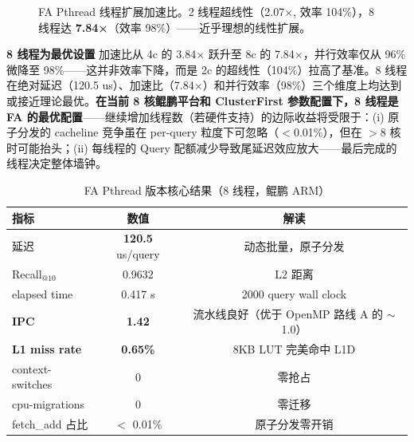 \documentclass[UTF8,a4paper,10pt]{ctexart}
\begin{document}
\begin{figure}[H]
\centering
{}
\caption{FA Pthread 线程扩展加速比。2 线程超线性（2.07×, 效率 104\%），8 线程达 \textbf{7.84×}（效率 98\%）——近乎理想的线性扩展。}
\label{fig:fa_speedup}
\end{figure}

\textbf{8 线程为最优设置} 加速比从 4c 的 3.84× 跃升至 8c 的 7.84×，并行效率仅从 96\% 微降至 98\%——这并非效率下降，而是 2c 的超线性（104\%）拉高了基准。8 线程在绝对延迟（120.5 us）、加速比（7.84×）和并行效率（98\%）三个维度上均达到或接近理论最优。\textbf{在当前 8 核鲲鹏平台和 ClusterFirst 参数配置下，8 线程是 FA 的最优配置}——继续增加线程数（若硬件支持）的边际收益将受限于：(i) 原子分发的 cacheline 竞争虽在 per-query 粒度下可忽略（$<$0.01\%），但在 $>$8 核时可能抬头；(ii) 每线程的 Query 配额减少导致尾延迟效应放大——最后完成的线程决定整体墙钟。


\begin{table}[H]
\centering
\caption{FA Pthread 版本核心结果（8 线程，鲲鹏 ARM）}
\begin{tabular}{lcc}
\hline
指标 & 数值 & 解读 \\
\hline
延迟 & \textbf{120.5} us/query & 动态批量，原子分发 \\
Recall$_{@10}$ & 0.9632 & L2 距离 \\
elapsed time & 0.417 s & 2000 query wall clock \\
\textbf{IPC} & \textbf{1.42} & 流水线良好（优于 OpenMP 路线 A 的 $\sim$1.0） \\
\textbf{L1 miss rate} & \textbf{0.65\%} & 8KB LUT 完美命中 L1D \\
context-switches & 0 & 零抢占 \\
cpu-migrations & 0 & 零迁移 \\
fetch\_add 占比 & $<$ 0.01\% & 原子分发零开销 \\
\hline
\end{tabular}
\end{table}
\end{document}
